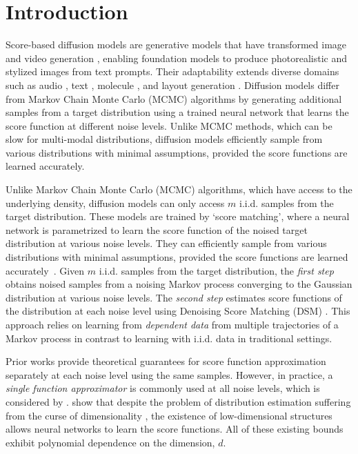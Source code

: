 \section{Introduction}
Score-based diffusion models \cite{sohl2015deep,ho2020denoising} are generative models 
that have transformed image and video generation \cite{rombach2022high,saharia2022photorealistic,ramesh2022hierarchical,podell2023sdxl}, enabling foundation models to produce photorealistic and stylized images from text prompts. Their adaptability extends diverse domains such as audio \cite{kong2021diffwave,evans2024fast}, text \cite{gulrajani2024likelihood,han2022ssd,lou2023discrete,varma2024glauber}, molecule \cite{hoogeboom2022equivariant,hua2024mudiff}, and layout generation \cite{inoue2023layoutdm,levi2023dlt}. Diffusion models differ from Markov Chain Monte Carlo (MCMC) algorithms by generating additional samples from a target distribution using a trained neural network that learns the score function at different noise levels. Unlike MCMC methods, which can be slow for multi-modal distributions, diffusion models efficiently sample from various distributions with minimal assumptions, provided the score functions are learned accurately.

Unlike Markov Chain Monte Carlo (MCMC) algorithms, which have access to the underlying density, diffusion models can only access $m$ i.i.d. samples from the target distribution. These models are trained by `score matching', where a neural network is parametrized to learn the score function of the noised target distribution at various noise levels. They can efficiently sample from various distributions with minimal assumptions, provided the score functions are learned accurately~\cite{chen2022sampling, benton2024nearly}. 
Given $m$ i.i.d. samples from the target distribution, the \textit{first step} obtains noised samples from a noising Markov process converging to the Gaussian distribution at various noise levels. The \textit{second step} estimates score functions of the distribution at each noise level using Denoising Score Matching (DSM) \cite{vincent2011connection}. This approach relies on learning from \textit{dependent data} from multiple trajectories of a Markov process in contrast to learning with i.i.d. data in traditional settings.

Prior works \cite{block2020generative, gupta2023sample} provide theoretical guarantees for score function approximation separately at each noise level using the same samples. 
However, in practice, a \emph{single function approximator} is commonly used at all noise levels, which is considered by \cite{han2024neural}. 
\cite{boffi2024shallow} show that despite the problem of distribution estimation suffering from the curse of dimensionality \cite{chen2023score,oko2023diffusion}, the existence of low-dimensional structures allows neural networks to learn the score functions. All of these existing bounds exhibit polynomial dependence on the dimension, $d$.

